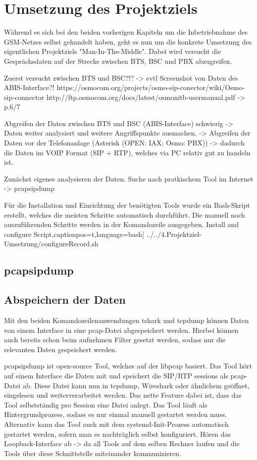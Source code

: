 \section{Umsetzung des Projektziels}
Während es sich bei den beiden vorherigen Kapiteln um die Inbetriebnahme des GSM-Netzes selbst gehandelt haben, geht es nun um die konkrete Umsetzung des eigentlichen Projektziels "Man-In-The-Middle". Dabei wird versucht die Gesprächsdaten auf der Strecke zwischen BTS, BSC und PBX abzugreifen.

Zuerst versucht zwischen BTS und BSC?!?
-> evtl Screenshot von Daten des ABIS-Interface?!
https://osmocom.org/projects/osmo-sip-conector/wiki/Osmo-sip-connector
http://ftp.osmocom.org/docs/latest/osmonitb-usermanual.pdf -> p.6/7

Abgreifen der Daten zwischen BTS und BSC (ABIS-Interface) schwierig -> Daten weiter analysiert und weitere Angriffspunkte ausmachen.
-> Abgreifen der Daten vor der Telefonanlage (Asterisk (OPEN: IAX; Osmo: PBX)) -> dadurch die Daten im VOIP Format (SIP + RTP), welches via PC relativ gut zu handeln ist.

Zunächst eigenes analysieren der Daten. Suche nach pratkischem Tool im Internet
-> pcapsipdump

Für die Installation und Einrichtung der benötigten Tools wurde ein Bash-Skript erstellt, welches die meisten Schritte automatisch durchführt. Die manuell noch auszuführenden Schritte werden in der Komandozeile ausgegeben.
{Install and configure Script}\label{lst:configure.sh},captionpos=t,language=bash]
{../../4.Projektziel-Umsetzung/configureRecord.sh}


\subsection{pcapsipdump}
\subsection{Abspeichern der Daten}
Mit den beiden Komandozeilenanwendungen tshark und tcpdump können Daten von einem Interface in eine pcap-Datei abgespeichert werden. Hierbei können auch bereits schon beim aufnehmen Filter gesetzt werden, sodass nur die relevanten Daten gespeichert werden.


pcapsipdump ist open-source Tool, welches auf der libpcap basiert. Das Tool hört auf einem Interface die Daten mit und speichert die SIP/RTP sessions als pcap-Datei ab. Diese Datei kann nun in tcpdump, Wireshark oder ähnlichem geöffnet, eingelesen und weiterverarbeitet werden. Das nette Feature dabei ist, dass das Tool selbstständig pro Session eine Datei anlegt. Das Tool läuft als Hintergrundprozess, sodass es nur einmal manuell gestartet werden muss. Alternativ kann das Tool auch mit dem systemd-Init-Prozess automatisch gestartet werden, sofern man es nachträglich selbst konfiguriert.
Hören das Loopback-Interface ab -> da all Tools auf dem selben Rechner laufen und die Tools über diese Schnittstelle miteinander kommunizieren.

